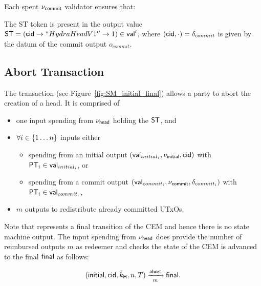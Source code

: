 \noindent Each spent $\nu_\mathsf{commit}$ validator ensures that:
\begin{menumerate}
  \item The ST token is present in the output value
  $\mathsf{ST} = (\mathsf{cid} \rightarrow ``HydraHeadV1'' \rightarrow 1) \in \mathsf{val}'$, where
  $(\mathsf{cid},\cdot) = \delta_{commit}$ is given by the datum of the commit output
  $o_{commit}$.
\end{menumerate}

\subsection{Abort Transaction}\label{sec:abort-tx}



The \mtxAbort{} transaction (see Figure~\ref{fig:SM_initial_final}) allows a
party to abort the creation of a head. It is comprised of
\begin{itemize}
  \item one input spending from $\nu_\mathsf{head}$ holding the $\mathsf{ST}$, and
  \item $\forall i \in \{1 \dots n\}$ inputs either
    \begin{itemize}
      \item spending from an initial output $(\mathsf{val}_{initial_i}, \nu_\mathsf{initial}, \mathsf{cid})$ with $\mathsf{PT}_{i} \in \mathsf{val}_{initial_i}$, or
      \item spending from a commit output $(\mathsf{val}_{commit_i}, \nu_\mathsf{commit}, \delta_{commit_i})$ with $\mathsf{PT}_{i} \in \mathsf{val}_{commit_{i}}$,
    \end{itemize}
  \item $m$ outputs to redistribute already committed UTxOs.
\end{itemize}
Note that \mtxAbort{} represents a final transition of the CEM and hence there
is no state machine output. The input spending from $\nu_\mathsf{head}$ does provide the
number of reimbursed outputs $m$ as redeemer and checks the state of the CEM is
advanced to the final $\mathsf{final}$ as follows:

\[
   (\mathsf{initial},\mathsf{cid},\tilde{k}_{\mathsf{H}},n,T) \xrightarrow[m]{\mathsf{abort}} \mathsf{final}.
\]

